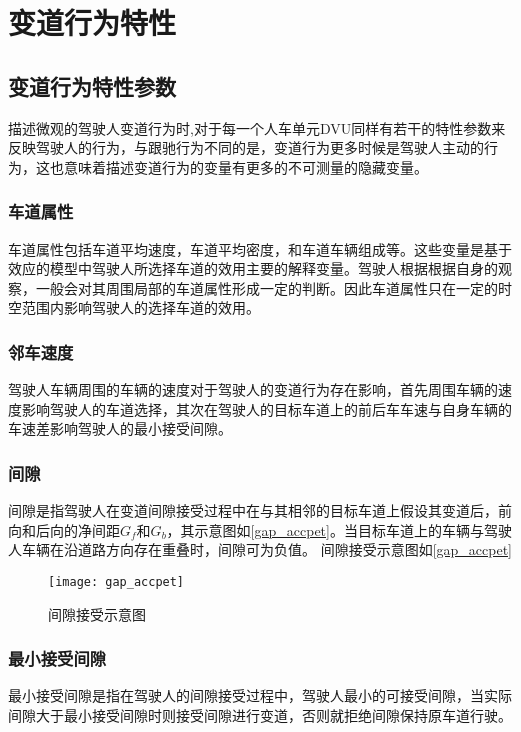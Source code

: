 \section{变道行为特性}

\subsection{变道行为特性参数}
描述微观的驾驶人变道行为时,对于每一个人车单元DVU同样有若干的特性参数来反映驾驶人的行为，与跟驰行为不同的是，变道行为更多时候是驾驶人主动的行为，这也意味着描述变道行为的变量有更多的不可测量的隐藏变量。


\subsubsection{车道属性}
车道属性包括车道平均速度，车道平均密度，和车道车辆组成等。这些变量是基于效应的模型中驾驶人所选择车道的效用主要的解释变量。驾驶人根据根据自身的观察，一般会对其周围局部的车道属性形成一定的判断。因此车道属性只在一定的时空范围内影响驾驶人的选择车道的效用。

\subsubsection{邻车速度}
驾驶人车辆周围的车辆的速度对于驾驶人的变道行为存在影响，首先周围车辆的速度影响驾驶人的车道选择，其次在驾驶人的目标车道上的前后车车速与自身车辆的车速差影响驾驶人的最小接受间隙。

\subsubsection{间隙}
间隙是指驾驶人在变道间隙接受过程中在与其相邻的目标车道上假设其变道后，前向和后向的净间距$G_f$和$G_b$，其示意图如\autoref{gap_accpet}。当目标车道上的车辆与驾驶人车辆在沿道路方向存在重叠时，间隙可为负值。
间隙接受示意图如\autoref{gap_accpet}
\begin{figure}[htpb]
	\centering
	\texttt{[image: gap\_accpet]}
	\caption{间隙接受示意图}
	\label{gap_accpet}
\end{figure}

\subsubsection{最小接受间隙}
最小接受间隙是指在驾驶人的间隙接受过程中，驾驶人最小的可接受间隙，当实际间隙大于最小接受间隙时则接受间隙进行变道，否则就拒绝间隙保持原车道行驶。

